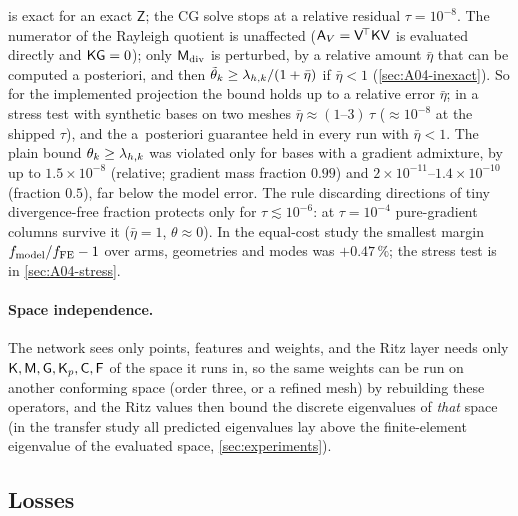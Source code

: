 \begin{remark}\label{rem:04-inexact}
 is exact for an exact $\mathsf Z$; the CG solve stops at a relative residual $\tau=10^{-8}$.
The numerator of the Rayleigh quotient is unaffected ($\Av=\Vmat^{\!\top}\Kmat\Vmat$ is evaluated directly and $\mathsf{K}\mathsf{G}=0$); only $\Mdiv$ is perturbed, by a relative amount $\bar\eta$ that can be computed a posteriori, and then $\tilde\theta_k\ge\lamh_k/(1+\bar\eta)$ if $\bar\eta<1$ (\cref{sec:A04-inexact}).
So for the implemented projection the bound holds up to a relative error $\bar\eta$; in a stress test with synthetic bases on two meshes $\bar\eta\approx(1\text{--}3)\,\tau$ ($\approx10^{-8}$ at the shipped $\tau$), and the a~posteriori guarantee held in every run with $\bar\eta<1$.
The plain bound $\theta_k\ge\lamh_k$ was violated only for bases with a gradient admixture, by up to $1.5\times10^{-8}$ (relative; gradient mass fraction $0.99$) and $2\times10^{-11}$--$1.4\times10^{-10}$ (fraction $0.5$), far below the model error.
The rule discarding directions of tiny divergence-free fraction protects only for $\tau\lesssim10^{-6}$: at $\tau=10^{-4}$ pure-gradient columns survive it ($\bar\eta=1$, $\theta\approx0$).
In the equal-cost study the smallest margin $f_{\rm model}/f_{\rm FE}-1$ over arms, geometries and modes was $+0.47\,\%$; the stress test is in \cref{sec:A04-stress}.
\end{remark}

\paragraph{Space independence.}\label{rem:04-space}
The network sees only points, features and weights, and the Ritz layer needs only $\Kmat,\Mmat,\Gmat,\Kp,\Cmat,\mathsf F$ of the space it runs in, so the same weights can be run on another conforming space (order three, or a refined mesh) by rebuilding these operators, and the Ritz values then bound the discrete eigenvalues of \emph{that} space (in the transfer study all predicted eigenvalues lay above the finite-element eigenvalue of the evaluated space, \cref{sec:experiments}).

\subsection{Losses}\label{sec:04-loss}

